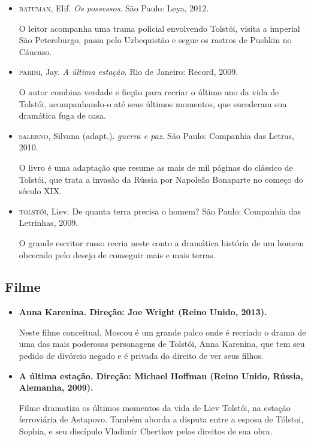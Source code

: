\documentclass[12pt]{extarticle}
\begin{document}
\begin{itemize}
\item\textsc{batuman}, Elif. \textit{Os possessos}. São Paulo: Leya, 2012.

O leitor acompanha uma trama policial envolvendo Tolstói, visita a
imperial São Petersburgo, passa pelo Uzbequistão e segue os rastros de
Pushkin no Cáucaso.

\item\textsc{parini}, Jay. \textit{A última estação}. Rio de Janeiro: Record, 2009.

O autor combina verdade e ficção para recriar o último ano da vida de
Tolstói, acompanhando-o até seus últimos momentos, que sucederam sua
dramática fuga de casa.

\item\textsc{salerno}, Silvana (adapt.). \textit{guerra e paz}. São Paulo: Companhia
das Letras, 2010.

O livro é uma adaptação que resume as mais de mil páginas do clássico de
Tolstói, que trata a invasão da Rússia por Napoleão Bonaparte no começo
do século XIX.

\item\textsc{tolstói}, Liev. De quanta terra precisa o homem? São Paulo:
Companhia das Letrinhas, 2009.

O grande escritor russo recria neste conto a dramática história de um
homem obcecado pelo desejo de conseguir mais e mais terras.
\end{itemize}

\subsection{Filme}

\begin{itemize}
\item\textbf{Anna Karenina. Direção: Joe Wright (Reino Unido, 2013).}

Neste filme conceitual, Moscou é um grande palco onde é recriado o drama
de uma das mais poderosas personagens de Tolstói, Anna Karenina, que tem
seu pedido de divórcio negado e é privada do direito de ver seus filhos.

\item\textbf{A última estação. Direção: Michael Hoffman (Reino Unido, Rússia,
Alemanha, 2009).}

Filme dramatiza os últimos momentos da vida de Liev Tolstói, na estação
ferroviária de Astapovo. Também aborda a disputa entre a esposa de
Tólstoi, Sophia, e seu discípulo Vladimir Chertkov pelos direitos de sua
obra.
\end{itemize}
\end{document}
